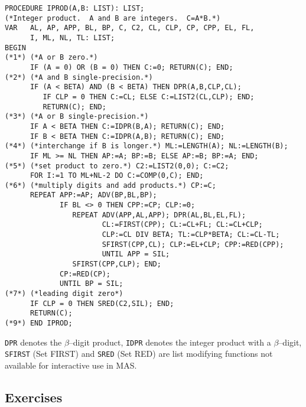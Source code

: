 {\footnotesize
\begin{verbatim}
PROCEDURE IPROD(A,B: LIST): LIST;
(*Integer product.  A and B are integers.  C=A*B.*)
VAR   AL, AP, APP, BL, BP, C, C2, CL, CLP, CP, CPP, EL, FL, 
      I, ML, NL, TL: LIST;
BEGIN
(*1*) (*A or B zero.*)
      IF (A = 0) OR (B = 0) THEN C:=0; RETURN(C); END;
(*2*) (*A and B single-precision.*)
      IF (A < BETA) AND (B < BETA) THEN DPR(A,B,CLP,CL);
         IF CLP = 0 THEN C:=CL; ELSE C:=LIST2(CL,CLP); END;
         RETURN(C); END;
(*3*) (*A or B single-precision.*)
      IF A < BETA THEN C:=IDPR(B,A); RETURN(C); END;
      IF B < BETA THEN C:=IDPR(A,B); RETURN(C); END;
(*4*) (*interchange if B is longer.*) ML:=LENGTH(A); NL:=LENGTH(B);
      IF ML >= NL THEN AP:=A; BP:=B; ELSE AP:=B; BP:=A; END;
(*5*) (*set product to zero.*) C2:=LIST2(0,0); C:=C2;
      FOR I:=1 TO ML+NL-2 DO C:=COMP(0,C); END;
(*6*) (*multiply digits and add products.*) CP:=C;
      REPEAT APP:=AP; ADV(BP,BL,BP);
             IF BL <> 0 THEN CPP:=CP; CLP:=0;
                REPEAT ADV(APP,AL,APP); DPR(AL,BL,EL,FL);
                       CL:=FIRST(CPP); CL:=CL+FL; CL:=CL+CLP;
                       CLP:=CL DIV BETA; TL:=CLP*BETA; CL:=CL-TL;
                       SFIRST(CPP,CL); CLP:=EL+CLP; CPP:=RED(CPP);
                       UNTIL APP = SIL;
                SFIRST(CPP,CLP); END;
             CP:=RED(CP);
             UNTIL BP = SIL;
(*7*) (*leading digit zero*)
      IF CLP = 0 THEN SRED(C2,SIL); END;
      RETURN(C);
(*9*) END IPROD;
\end{verbatim}
}
\verb/DPR/ denotes the $\beta$--digit product,
\verb/IDPR/ denotes the integer product with a $\beta$--digit,
\verb/SFIRST/ (Set FIRST) 
and \verb/SRED/ (Set RED)
are list modifying
functions not available for interactive use in MAS.


\subsection{Exercises}

